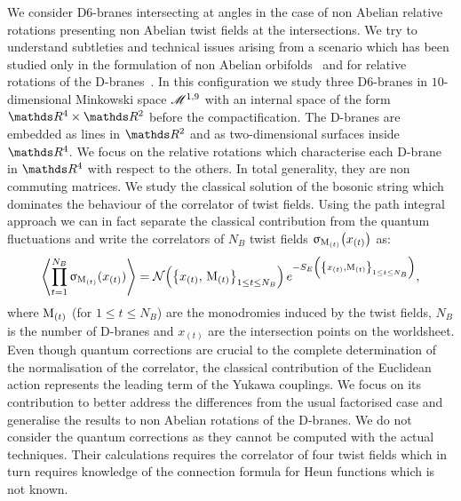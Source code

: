 We consider D6-branes intersecting at angles in the case of non Abelian relative rotations presenting non Abelian twist fields at the intersections.
We try to understand subtleties and technical issues arising from a scenario which has been studied only in the formulation of non Abelian orbifolds~\cite{Inoue:1987:NonAbelianOrbifolds,Inoue:1990:StringInteractionsNonAbelian,Gato:1990:VertexOperatorsNonAbelian} and for relative  rotations of the D-branes~\cite{Pesando:2016:FullyStringyComputation}.
In this configuration we study three D6-branes in $10$-dimensional Minkowski space $\mathscr{M}^{1,9}$ with an internal space of the form $\R^4 \times \R^2$ before the compactification.
The D-branes are embedded as lines in $\R^2$ and as two-dimensional surfaces inside $\R^4$.
We focus on the relative rotations which characterise each D-brane in $\R^4$ with respect to the others.
In total generality, they are non commuting  matrices.
We study the classical solution of the bosonic string which dominates the behaviour of the correlator of twist fields.
Using the path integral approach we can in fact separate the classical contribution from the quantum fluctuations and write the correlators of $N_B$ twist fields $\upsigma_{\mathrm{M}_{(t)}}\qty( x_{(t)} )$ as:\footnotemark{}
\begin{equation}
  \left\langle
    \finiteprod{t}{1}{N_B}
    \sigma_{\rM_{(t)}}(x_{(t)})
  \right\rangle
  =
  \cN
  \qty(
    \qty{ x_{(t)},\, \rM_{(t)} }_{1 \le t \le N_B}
  )\,
  e^{-S_E\qty( \qty{ x_{(t)}, \rM_{(t)} }_{1 \le t \le N_B} )},
\end{equation}
where $\mathrm{M}_{(t)}$ (for $1 \le t \le N_B$) are the monodromies induced by the twist fields, $N_B$ is the number of D-branes and $x_{(t)}$ are the intersection points on the worldsheet.
Even though quantum corrections are crucial to the complete determination of the normalisation of the correlator, the classical contribution of the Euclidean action represents the leading term of the Yukawa couplings.
We focus on its contribution to better address the differences from the usual factorised case and generalise the results to non Abelian rotations of the D-branes.
We do not consider the quantum corrections as they cannot be computed with the actual techniques.
Their calculations requires the correlator of four twist fields which in turn requires knowledge of the connection formula for Heun functions which is not known.

